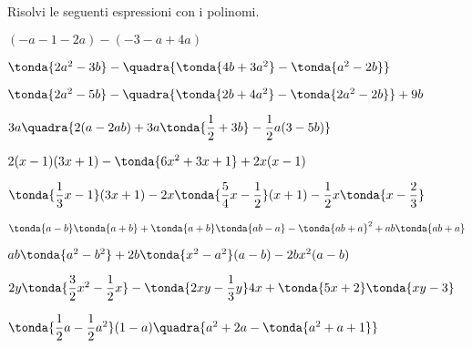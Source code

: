 \begin{esercizio}
\label{ese:10.21}
Risolvi le seguenti espressioni con i polinomi.
\begin{enumeratea}
\spazielenx
\item \((-a-1-2a)-(-3-a+4a)\) 
\item \(\tonda{2a^{2}-3b}-\quadra{\tonda{4b+3a^{2}}-\tonda{a^{2}-2b}}\) 
\item \(\tonda{2a^{2}-5b}-\quadra{\tonda{2b+4a^{2}}-\tonda{2a^{2}-2b}}+9b\)
\item 
\(3a\quadra{2(a-2ab)+3a\tonda{\dfrac{1}{2}+3b}-\dfrac{1}{2}a(3-5b)}\) 
\item \(2(x-1)(3x+1)-\tonda{6x^{2}+3x+1}+2x(x-1)\) 
\item \(\tonda{\dfrac{1}{3}x-1}(3x+1) - 2x\tonda{\dfrac{5}{4}x - 
\dfrac{1}{2}}(x+1) - \dfrac{1}{2}x\tonda{x-\dfrac{2}{3}}\) 
\item \(\tonda{a-b}\tonda{a+b} + \tonda{a+b}\tonda{ab-a} - 
\tonda{ab+a}^2 + ab\tonda{ab+a}\) 
\item \(ab\tonda{a^{2} - b^{2}} + 2b\tonda{x^{2} - a^{2}}(a-b) - 
2bx^{2}(a-b)\) 
\item \(2y \tonda{\dfrac{3}{2}x^{2} - \dfrac{1}{2}x} -
      \tonda{2xy - \dfrac{1}{3}y} 4x + \tonda{5x+2}\tonda{xy-3}\) 
\item \(\tonda{\dfrac{1}{2}a-\dfrac{1}{2}a^{2}}(1-a)\quadra{a^{2}+2a - 
\tonda{a^{2}+a+1}}\) 

\end{enumeratea}
\end{esercizio}
